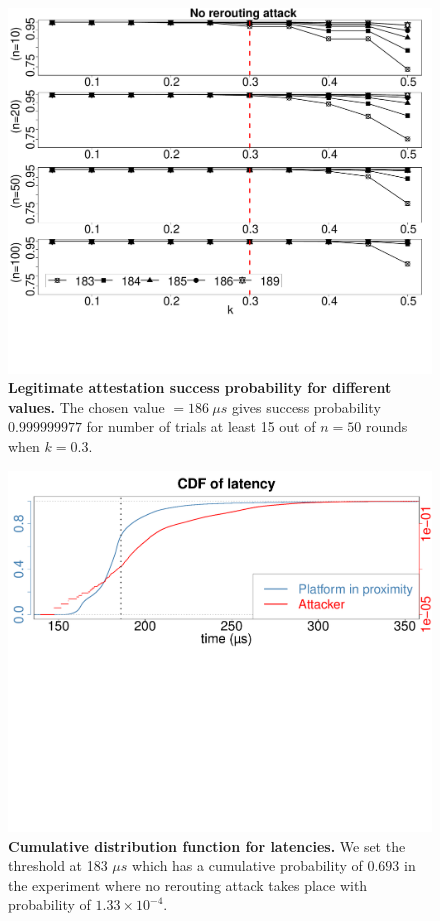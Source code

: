 \begin{figure}[h]
  \centering
    \includegraphics[trim={0 5cm 0 0}, clip, width=\linewidth]{chapters/ProximiTEE/data/fx3_data/timeRound.pdf}
    \caption[Legitimate attestation success probability for different \connect values]{\textbf{Legitimate attestation success probability for different \connect values.} The chosen value \connect $=186\ \mu s$ gives success probability $0.999999977$ for number of trials at least 15 out of $n=50$ rounds when $k=0.3$.}
    \label{graph:diffTh}
\end{figure}


\begin{figure}[h]
  \centering

    \includegraphics[trim={0 15cm 0 0}, clip, width=0.9\linewidth]{chapters/ProximiTEE/data/fx3_data/CDF_N.pdf}
    \caption[Cumulative distribution function for latencies]{\textbf{Cumulative distribution function for latencies.} We set the threshold \connect at 183 $\mu s$ which has a cumulative probability of $0.693$ in the experiment where no rerouting attack takes place with probability of $1.33\times10^{-4}$.}
    \label{fig:cdf}
\end{figure}


